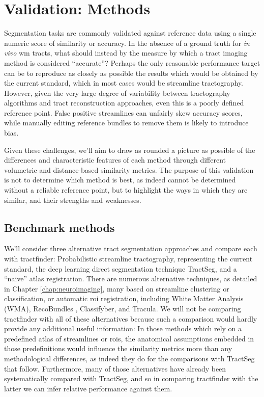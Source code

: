 
\section{Validation: Methods}

Segmentation tasks are commonly validated against reference data using a single numeric score of similarity or accuracy.
In the absence of a ground truth for \textit{in vivo} \gls{wm} tracts, what should instead by the measure by which a tract imaging method is considered ``accurate''?
Perhaps the only reasonable performance target can be to reproduce as closely as possible the results which would be obtained by the current standard, which in most cases would be streamline tractography.
However, given the very large degree of variability between tractography algorithms and tract reconstruction approaches, even this is a poorly defined reference point.
False positive streamlines can unfairly skew accuracy scores, while manually editing reference bundles to remove them is likely to introduce bias.

Given these challenges, we'll aim to draw as rounded a picture as possible of the differences and characteristic features of each method through different volumetric and distance-based similarity metrics.
The purpose of this validation is not to determine which method is best, as indeed cannot be determined without a reliable reference point, but to highlight the ways in which they are similar, and their strengths and weaknesses.

\subsection{Benchmark methods}
\label{sec:methods}

We'll consider three alternative tract segmentation approaches and compare each with tractfinder: Probabilistic streamline tractography, representing the current standard, the deep learning direct segmentation technique TractSeg, and a ``naive'' atlas registration.
There are numerous alternative techniques, as detailed in Chapter \ref{chap:neuroimaging}, many based on streamline clustering or classification, or automatic \gls{roi} registration, including White Matter Analysis (WMA)\autocite{ODonnell2017}, RecoBundles \autocite{Garyfallidis2018}, Classifyber\autocite{Berto2021}, and Tracula\autocite{Yendiki2011}.
We will not be comparing tractfinder with all of these alternatives because such a comparison would hardly provide any additional useful information:
In those methods which rely on a predefined atlas of streamlines or \glspl{roi}, the anatomical assumptions embedded in those predefinitions would influence the similarity metrics more than any methodological differences, as indeed they do for the comparisons with TractSeg that follow.
Furthermore, many of those alternatives have already been systematically compared with TractSeg\autocite{Wasserthal2018,Berto2021}, and so in comparing tractfinder with the latter we can infer relative performance against them.

